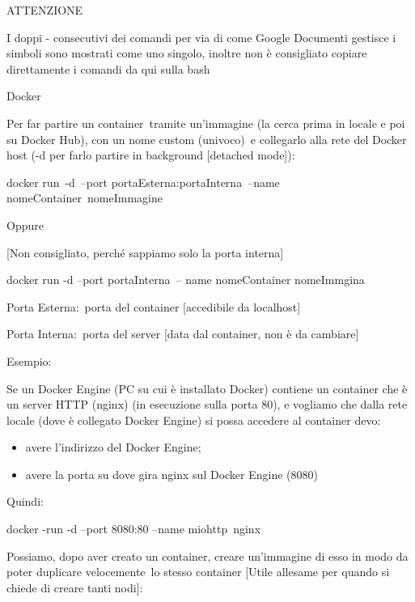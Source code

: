 \documentclass[
]{article}
\author{}
\date{}
\providecommand{\tightlist}{%
  \setlength{\itemsep}{0pt}\setlength{\parskip}{0pt}}
\begin{document}
{ATTENZIONE}

{I doppi - consecutivi dei comandi per via di come Google Documenti
gestisce i simboli sono mostrati come uno singolo, inoltre non è
consigliato copiare direttamente i comandi da qui sulla bash}

{}

{}

{Docker}

{Per far partire un container}{~}{tramite un'immagine (la cerca prima in
locale e poi su Docker Hub)}{, }{con un nome custom (univoco)}{~e
collegarlo alla rete del Docker host }{(-d per farlo partire in
background {[}detached mode{]})}{:}

{}

{docker run}{~}{-d}{~--port }{portaEsterna:portaInterna}{~}{--name
}{nomeContainer}{~}{nomeImmagine}

{}

{Oppure}

{{[}}{Non consigliato, perché sappiamo solo la porta interna}{{]}}

{}

{docker run -d --port }{portaInterna}{~-- name }{nomeContainer
nomeImmgina}

{}

{}

{Porta Esterna:}{~porta del container {[}accedibile da localhost{]}}

{Porta Interna:}{~porta del server {[}data dal container, non è da
cambiare{]}}

{}

{Esempio:}

{Se un Docker Engine (PC su cui è installato Docker) contiene un
container che è un server HTTP (nginx) (in esecuzione sulla porta 80), e
vogliamo che dalla rete locale (dove è collegato Docker Engine) si possa
accedere al container devo:}

\begin{itemize}
\tightlist
\item
  {avere l'indirizzo del Docker Engine;}
\item
  {avere la porta su dove gira nginx sul Docker Engine (8080)}
\end{itemize}

{}

{Quindi:}

{docker -run -d --port 8080}{:}{80 --name }{miohttp}{~nginx}

{}

{}

{Possiamo, dopo aver creato un container, creare un'immagine di esso in
modo da poter }{duplicare velocemente}{~lo stesso container {[}Utile
all\textquotesingle esame per quando si chiede di creare tanti nodi{]}:}
\end{document}
